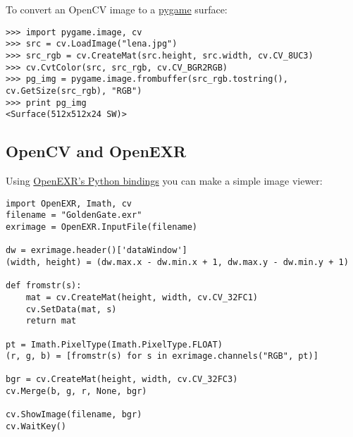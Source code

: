 To convert an OpenCV image to a \href{http://www.pygame.org/}{pygame} surface:

\begin{lstlisting}
>>> import pygame.image, cv
>>> src = cv.LoadImage("lena.jpg")
>>> src_rgb = cv.CreateMat(src.height, src.width, cv.CV_8UC3)
>>> cv.CvtColor(src, src_rgb, cv.CV_BGR2RGB)
>>> pg_img = pygame.image.frombuffer(src_rgb.tostring(), cv.GetSize(src_rgb), "RGB")
>>> print pg_img
<Surface(512x512x24 SW)>
\end{lstlisting}

\subsection{OpenCV and OpenEXR}

Using \href{http://www.excamera.com/sphinx/articles-openexr.html}{OpenEXR's Python bindings} you can make a simple
image viewer:

\begin{lstlisting}
import OpenEXR, Imath, cv
filename = "GoldenGate.exr"
exrimage = OpenEXR.InputFile(filename)

dw = exrimage.header()['dataWindow']
(width, height) = (dw.max.x - dw.min.x + 1, dw.max.y - dw.min.y + 1)

def fromstr(s):
    mat = cv.CreateMat(height, width, cv.CV_32FC1)
    cv.SetData(mat, s)
    return mat

pt = Imath.PixelType(Imath.PixelType.FLOAT)
(r, g, b) = [fromstr(s) for s in exrimage.channels("RGB", pt)]

bgr = cv.CreateMat(height, width, cv.CV_32FC3)
cv.Merge(b, g, r, None, bgr)

cv.ShowImage(filename, bgr)
cv.WaitKey()
\end{lstlisting}

\fi
